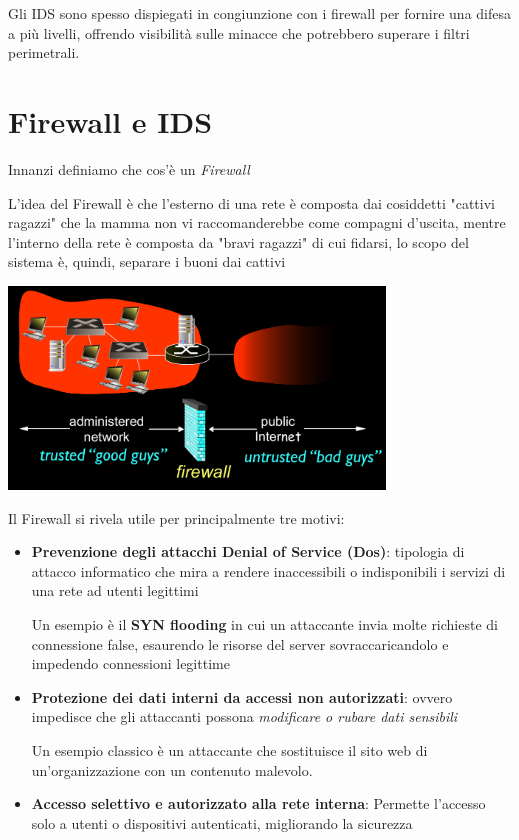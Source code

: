 Gli IDS sono spesso dispiegati in congiunzione con i firewall per fornire una difesa a più livelli, offrendo visibilità sulle minacce che potrebbero superare i filtri perimetrali.



\section{Firewall e IDS}

Innanzi definiamo che cos'è un \textit{Firewall}


L'idea del Firewall è che l'esterno di una rete è composta dai cosiddetti "cattivi ragazzi" che la mamma non vi raccomanderebbe come compagni d'uscita, mentre l'interno della rete è composta da "bravi ragazzi" di cui fidarsi, lo scopo del sistema è, quindi, separare i buoni dai cattivi

\begin{center}
    \includegraphics[width=10cm]{img/buoni_cattivi_e_firewall.png}
\end{center}

Il Firewall si rivela utile per principalmente tre motivi:
\begin{itemize}
    \item \textbf{Prevenzione degli attacchi Denial of Service (Dos)}: tipologia di attacco informatico che mira a rendere inaccessibili o indisponibili i servizi di una rete ad utenti legittimi
    
    Un esempio è il \textbf{SYN flooding} in cui un attaccante invia molte richieste di connessione false, esaurendo le risorse del server sovraccaricandolo e impedendo connessioni legittime

    \item \textbf{Protezione dei dati interni da accessi non autorizzati}: ovvero impedisce che gli attaccanti possona \textit{modificare o rubare dati sensibili}
    
    Un esempio classico è un attaccante che sostituisce il sito web di un'organizzazione con un contenuto malevolo.

    \item \textbf{Accesso selettivo e autorizzato alla rete interna}: Permette l’accesso solo a utenti o dispositivi autenticati, migliorando la sicurezza
\end{itemize}

